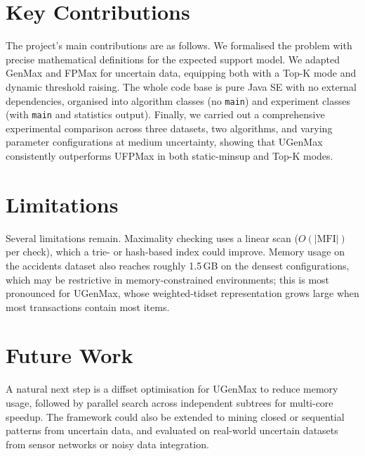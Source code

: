 \documentclass[12pt,a4paper]{report}
\begin{document}
  \section{Key Contributions}

  The project's main contributions are as follows. We formalised the problem with precise mathematical definitions for the expected support model. We adapted GenMax and FPMax for uncertain data, equipping both with a Top-K mode and dynamic threshold raising. The whole code base is pure Java SE with no external dependencies, organised into algorithm classes (no \texttt{main}) and experiment classes (with \texttt{main} and statistics output). Finally, we carried out a comprehensive experimental comparison across three datasets, two algorithms, and varying parameter configurations at medium uncertainty, showing that UGenMax consistently outperforms UFPMax in both static-minsup and Top-K modes.

  \section{Limitations}

  Several limitations remain. Maximality checking uses a linear scan ($O(|\text{MFI}|)$ per check), which a trie- or hash-based index could improve. Memory usage on the accidents dataset also reaches roughly 1.5\,GB on the densest configurations, which may be restrictive in memory-constrained environments; this is most pronounced for UGenMax, whose weighted-tidset representation grows large when most transactions contain most items.

  \section{Future Work}

  A natural next step is a diffset optimisation for UGenMax to reduce memory usage, followed by parallel search across independent subtrees for multi-core speedup. The framework could also be extended to mining closed or sequential patterns from uncertain data, and evaluated on real-world uncertain datasets from sensor networks or noisy data integration.
\end{document}
